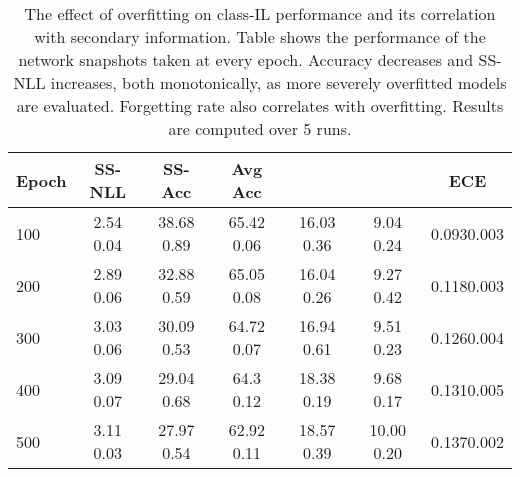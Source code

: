 \documentclass[final]{cvpr}
\newcommand{\cfr}{} \newcommand\todo[1]{(\textcolor{red}{TODO: #1})}
\begin{document}
  \begin{table*}[!t]
\centering
\begin{tabular}{|l@{\hskip3pt}|c@{\hskip3pt}|c@{\hskip3pt}|c@{\hskip3pt}|c|c|c|}
\hline
\textbf{Epoch}& \textbf{SS-NLL}  & \textbf{SS-Acc}  & \textbf{Avg Acc}  &   & \cfr  & ECE\\
    \hline
    \hline
    100 & 2.54  0.04  & 38.68  0.89  &   65.42   0.06    & 16.03   0.36  & 9.04   0.24 & 0.0930.003\\
    200 & 2.89  0.06  & 32.88  0.59  &   65.05   0.08    & 16.04   0.26  & 9.27   0.42 & 0.1180.003\\
    300 & 3.03  0.06  & 30.09  0.53  &   64.72   0.07    & 16.94   0.61  & 9.51   0.23 & 0.1260.004\\
    400 & 3.09  0.07  & 29.04  0.68  &   64.3    0.12    & 18.38   0.19  & 9.68   0.17 & 0.1310.005\\
    500 & 3.11  0.03  & 27.97  0.54  &   62.92   0.11    & 18.57   0.39  & 10.00   0.20 & 0.1370.002\\
    \hline
\end{tabular}
\vspace{5px}
\caption{The effect of overfitting on class-IL performance and its correlation with secondary information. Table shows the performance of the network snapshots taken at every  epoch.
Accuracy decreases and SS-NLL increases, both monotonically, as more severely overfitted models are evaluated. Forgetting rate  also correlates with overfitting. Results are computed over 5 runs.}
\label{tab:overfit_std}
\end{table*}
\end{document}
